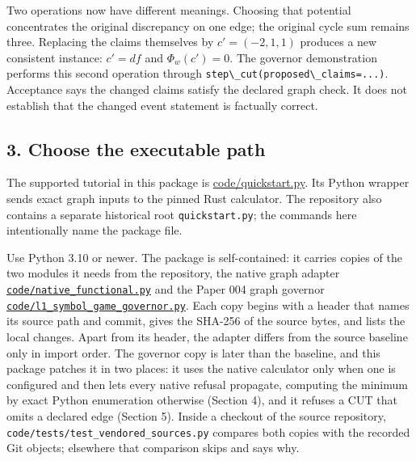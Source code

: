 \documentclass[
  11pt,
]{article}
\newcommand{\passthrough}[1]{#1}
\begin{document}
Two operations now have different meanings. Choosing that potential
concentrates the original discrepancy on one edge; the original cycle
sum remains three. Replacing the claims themselves by \(c'=(-2,1,1)\)
produces a new consistent instance: \(c'=df\) and \(\Phi_w(c')=0\). The
governor demonstration performs this second operation through
\passthrough{\lstinline!step\_cut(proposed\_claims=...)!}. Acceptance
says the changed claims satisfy the declared graph check. It does not
establish that the changed event statement is factually correct.

\subsection{3. Choose the executable
path}\label{choose-the-executable-path}

The supported tutorial in this package is
\href{https://github.com/dbccpage/the_symbol_game/blob/52cb5457f6c485ba548cfd292f6012a941ed22cf/atlas/coda_atlas/symbol_game/005_pfp_practitioners_field_manual/code/quickstart.py}{code/quickstart.py}.
Its Python wrapper sends exact graph inputs to the pinned Rust
calculator. The repository also contains a separate historical root
\passthrough{\lstinline!quickstart.py!}; the commands here intentionally
name the package file.

Use Python 3.10 or newer. The package is self-contained: it carries
copies of the two modules it needs from the repository, the native graph
adapter
\href{https://github.com/dbccpage/the_symbol_game/blob/52cb5457f6c485ba548cfd292f6012a941ed22cf/atlas/coda_atlas/symbol_game/005_pfp_practitioners_field_manual/code/native_functional.py}{\nolinkurl{code/native_functional.py}}
and the Paper 004 graph governor
\href{https://github.com/dbccpage/the_symbol_game/blob/52cb5457f6c485ba548cfd292f6012a941ed22cf/atlas/coda_atlas/symbol_game/005_pfp_practitioners_field_manual/code/l1_symbol_game_governor.py}{\nolinkurl{code/l1_symbol_game_governor.py}}.
Each copy begins with a header that names its source path and commit,
gives the SHA-256 of the source bytes, and lists the local changes.
Apart from its header, the adapter differs from the source baseline only
in import order. The governor copy is later than the baseline, and this
package patches it in two places: it uses the native calculator only
when one is configured and then lets every native refusal propagate,
computing the minimum by exact Python enumeration otherwise (Section 4),
and it refuses a CUT that omits a declared edge (Section 5). Inside a
checkout of the source repository,
\nolinkurl{code/tests/test_vendored_sources.py} compares both copies
with the recorded Git objects; elsewhere that comparison skips and says
why.
\end{document}
